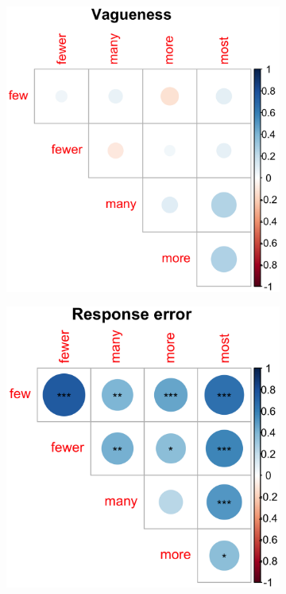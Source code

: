 \documentclass{article}
\begin{document}
\begin{figure} [H]
\begin{minipage}[b]{0.49\textwidth}
    \begin{subfigure}[b]{\linewidth}
     \includegraphics[width=\linewidth]{Figure2.3b.png}
     \caption{\label{fig:fig2.3b}}
    \end{subfigure}
\end{minipage}    
\hfill
\begin{minipage}[b]{0.49\textwidth}
    \begin{subfigure}[b]{\linewidth}
     \includegraphics[width=\linewidth]{Figure2.3c.png}

\end{subfigure}
\end{minipage}
\end{figure}
\end{document}
